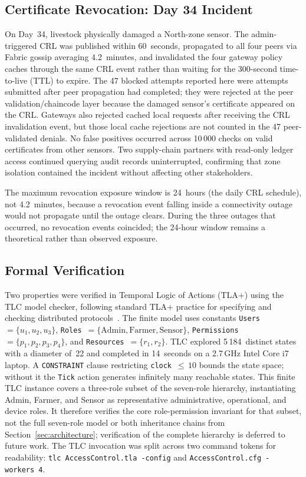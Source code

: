 \documentclass[a4paper,fleqn]{cas-dc}
\begin{document}
\subsection{Certificate Revocation: Day 34 Incident}
\label{subsec:revocation}

On Day~34, livestock physically damaged a North-zone sensor. The
admin-triggered CRL was published within 60~seconds, propagated to all
four peers via Fabric gossip averaging 4.2~minutes, and invalidated the
four gateway policy caches through the same CRL event rather than waiting
for the 300-second time-to-live (TTL) to expire. The 47 blocked attempts
reported here were attempts submitted after peer propagation had
completed; they were rejected at the peer validation/chaincode layer
because the damaged sensor's certificate appeared on the CRL. Gateways
also rejected cached local requests after receiving the CRL invalidation
event, but those local cache rejections are not counted in the 47 peer-
validated denials. No false positives occurred across 10\,000 checks on
valid certificates from other sensors. Two supply-chain partners with
read-only ledger access continued querying audit records uninterrupted,
confirming that zone isolation contained the incident without affecting
other stakeholders.

The maximum revocation exposure window is 24~hours (the daily CRL
schedule), not 4.2~minutes, because a revocation event falling inside
a connectivity outage would not propagate until the outage clears.
During the three outages that occurred, no revocation events coincided;
the 24-hour window remains a theoretical rather than observed exposure.

\subsection{Formal Verification}
\label{subsec:tla}

Two properties were verified in Temporal Logic of Actions (TLA+) using
the TLC model checker, following standard TLA+ practice for specifying
and checking distributed protocols~\cite{lamport2002specifying,newcombe2015amazon}. The
finite model uses constants \texttt{Users}~$= \{u_1, u_2, u_3\}$,
\texttt{Roles}~$= \{\mathrm{Admin}, \mathrm{Farmer}, \mathrm{Sensor}\}$,
\texttt{Permissions}~$= \{p_1, p_2, p_3, p_4\}$, and
\texttt{Resources}~$= \{r_1, r_2\}$. TLC explored 5\,184~distinct
states with a diameter of~22 and completed in 14~seconds on a
2.7\,GHz Intel Core i7 laptop. A \texttt{CONSTRAINT} clause
restricting \texttt{clock}~${\le}\,10$ bounds the state space; without
it the \texttt{Tick} action generates infinitely many reachable states.
This finite TLC instance covers a three-role subset of the seven-role
hierarchy, instantiating Admin, Farmer, and Sensor as representative
administrative, operational, and device roles. It therefore verifies the
core role-permission invariant for that subset, not the full seven-role
model or both inheritance chains from Section~\ref{sec:architecture};
verification of the complete hierarchy is deferred to future work.
The TLC invocation was split across two command tokens for readability:
\texttt{tlc~AccessControl.tla~-config} and
\texttt{AccessControl.cfg~-workers~4}.
\end{document}
